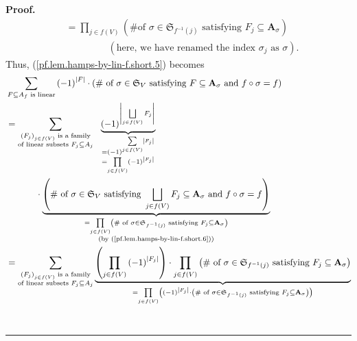\documentclass[numbers=enddot,12pt,final,onecolumn,notitlepage]{scrartcl}%
\numberwithin{exer}{section}
\theoremstyle{definition}
\newenvironment{proof}[1][Proof]{\noindent\textbf{#1.} }{\ \rule{0.5em}{0.5em}}
\let\sumnonlimits\sum
\let\prodnonlimits\prod
\let\sqcupnonlimits\bigsqcup
\renewcommand{\sum}{\sumnonlimits\limits}
\renewcommand{\prod}{\prodnonlimits\limits}
\renewcommand{\bigsqcup}{\sqcupnonlimits\limits}
\newenvironment{vershort}{}{}
\begin{document}
\begin{vershort}
\begin{proof}
\begin{align}
&  =\prod_{j\in f\left(  V\right)  }\left(  \text{\# of }\sigma\in
\mathfrak{S}_{f^{-1}\left(  j\right)  }\text{ satisfying }F_{j}\subseteq
\mathbf{A}_{\sigma}\right) \label{pf.lem.hamps-by-lin-f.short.6}\\
&  \ \ \ \ \ \ \ \ \ \ \ \ \ \ \ \ \ \ \ \ \left(  \text{here, we have renamed
the index }\sigma_{j}\text{ as }\sigma\right)  .\nonumber
\end{align}
Thus, (\ref{pf.lem.hamps-by-lin-f.short.5}) becomes%
\begin{align*}
&  \sum_{F\subseteq A_{f}\text{ is linear}}\left(  -1\right)  ^{\left\vert
F\right\vert }\cdot\left(  \text{\# of }\sigma\in\mathfrak{S}_{V}\text{
satisfying }F\subseteq\mathbf{A}_{\sigma}\text{ and }f\circ\sigma=f\right) \\
&  =\sum_{\substack{\left(  F_{j}\right)  _{j\in f\left(  V\right)  }\text{ is
a family}\\\text{of linear subsets }F_{j}\subseteq A_{j}}%
}\ \ \underbrace{\left(  -1\right)  ^{\left\vert \bigsqcup_{j\in f\left(
V\right)  }F_{j}\right\vert }}_{\substack{=\left(  -1\right)  ^{\sum_{j\in
f\left(  V\right)  }\left\vert F_{j}\right\vert }\\=\prod_{j\in f\left(
V\right)  }\left(  -1\right)  ^{\left\vert F_{j}\right\vert }}}\\
&  \ \ \ \ \ \ \ \ \ \ \cdot\underbrace{\left(  \text{\# of }\sigma
\in\mathfrak{S}_{V}\text{ satisfying }\bigsqcup_{j\in f\left(  V\right)
}F_{j}\subseteq\mathbf{A}_{\sigma}\text{ and }f\circ\sigma=f\right)
}_{\substack{=\prod_{j\in f\left(  V\right)  }\left(  \text{\# of }\sigma
\in\mathfrak{S}_{f^{-1}\left(  j\right)  }\text{ satisfying }F_{j}%
\subseteq\mathbf{A}_{\sigma}\right)  \\\text{(by
(\ref{pf.lem.hamps-by-lin-f.short.6}))}}}\\
&  =\sum_{\substack{\left(  F_{j}\right)  _{j\in f\left(  V\right)  }\text{ is
a family}\\\text{of linear subsets }F_{j}\subseteq A_{j}}}\underbrace{\left(
\prod_{j\in f\left(  V\right)  }\left(  -1\right)  ^{\left\vert F_{j}%
\right\vert }\right)  \cdot\prod_{j\in f\left(  V\right)  }\left(  \text{\# of
}\sigma\in\mathfrak{S}_{f^{-1}\left(  j\right)  }\text{ satisfying }%
F_{j}\subseteq\mathbf{A}_{\sigma}\right)  }_{=\prod_{j\in f\left(  V\right)
}\left(  \left(  -1\right)  ^{\left\vert F_{j}\right\vert }\cdot\left(
\text{\# of }\sigma\in\mathfrak{S}_{f^{-1}\left(  j\right)  }\text{ satisfying
}F_{j}\subseteq\mathbf{A}_{\sigma}\right)  \right)  }\\

\end{align*}
\end{proof}
\end{vershort}
\end{document}
